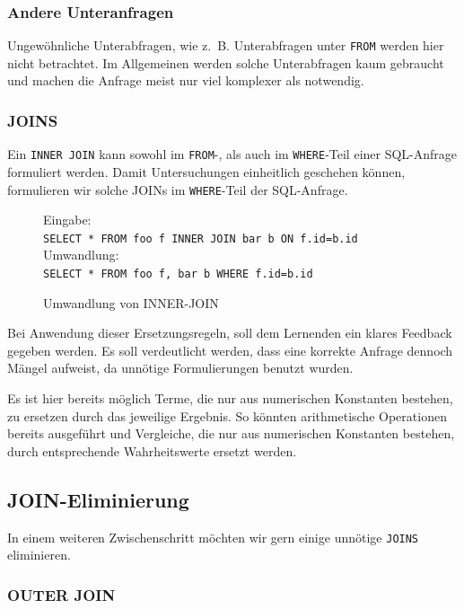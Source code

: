 \subsubsection{Andere Unteranfragen}

Ungewöhnliche Unterabfragen, wie \mbox{z. B.} Unterabfragen unter \verb|FROM| werden hier nicht betrachtet. Im Allgemeinen werden solche Unterabfragen kaum gebraucht und machen die Anfrage meist nur viel komplexer als notwendig.

\subsubsection{JOINS}
Ein \verb|INNER JOIN| kann sowohl im \verb|FROM|-, als auch im \verb|WHERE|-Teil einer SQL-Anfrage formuliert werden. Damit Untersuchungen einheitlich geschehen können, formulieren wir solche JOINs im \verb|WHERE|-Teil der SQL-Anfrage.

\begin{figure}[h]
Eingabe:\\
\verb|SELECT * FROM foo f INNER JOIN bar b ON f.id=b.id|\\

Umwandlung:\\
\verb|SELECT * FROM foo f, bar b WHERE f.id=b.id|\\
\caption{Umwandlung von INNER-JOIN}
\end{figure}

Bei Anwendung dieser Ersetzungsregeln, soll dem Lernenden ein klares Feedback gegeben werden. Es soll verdeutlicht werden, dass eine korrekte Anfrage dennoch Mängel aufweist, da unnötige Formulierungen benutzt wurden.

Es ist hier bereits möglich Terme, die nur aus numerischen Konstanten bestehen, zu ersetzen durch das jeweilige Ergebnis. So könnten arithmetische Operationen bereits ausgeführt und Vergleiche, die nur aus numerischen Konstanten bestehen, durch entsprechende Wahrheitswerte ersetzt werden.

\subsection{JOIN-Eliminierung}

In einem weiteren Zwischenschritt möchten wir gern einige unnötige \verb|JOINS| eliminieren.

\subsubsection{OUTER JOIN}

